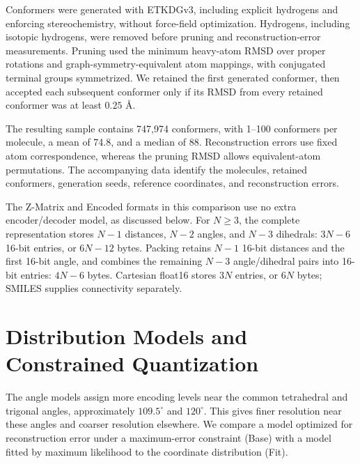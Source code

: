 \documentclass[%
 preprint,
superscriptaddress,
 amsmath,amssymb,
 aip,
 jcp,
]{revtex4-2}
\begin{document}
Conformers were generated with ETKDGv3, including explicit hydrogens and enforcing stereochemistry, without force-field optimization.\cite{Riniker2015ETKDG,Wang2020ETKDGMacrocycles}
Hydrogens, including isotopic hydrogens, were removed before pruning and reconstruction-error measurements.
Pruning used the minimum heavy-atom RMSD over proper rotations and graph-symmetry-equivalent atom mappings, with conjugated terminal groups symmetrized.
We retained the first generated conformer, then accepted each subsequent conformer only if its RMSD from every retained conformer was at least $0.25$ \AA.

The resulting sample contains 747,974 conformers, with 1--100 conformers per molecule, a mean of 74.8, and a median of 88.
Reconstruction errors use fixed atom correspondence, whereas the pruning RMSD allows equivalent-atom permutations.
The accompanying data identify the molecules, retained conformers, generation seeds, reference coordinates, and reconstruction errors.

The Z-Matrix and Encoded formats in this comparison use no extra encoder/decoder model, as discussed below.
For $N\geq3$, the complete representation stores $N-1$ distances, $N-2$ angles, and $N-3$ dihedrals: $3N-6$ 16-bit entries, or $6N-12$ bytes.
Packing retains $N-1$ 16-bit distances and the first 16-bit angle, and combines the remaining $N-3$ angle/dihedral pairs into 16-bit entries: $4N-6$ bytes.
Cartesian float16 stores $3N$ entries, or $6N$ bytes; SMILES supplies connectivity separately.

\section{Distribution Models and Constrained Quantization}
\label{sec:distribution_methods}

The angle models assign more encoding levels near the common tetrahedral and trigonal angles, approximately $109.5^\circ$ and $120^\circ$.
This gives finer resolution near these angles and coarser resolution elsewhere.
We compare a model optimized for reconstruction error under a maximum-error constraint (Base) with a model fitted by maximum likelihood to the coordinate distribution (Fit).
\end{document}
